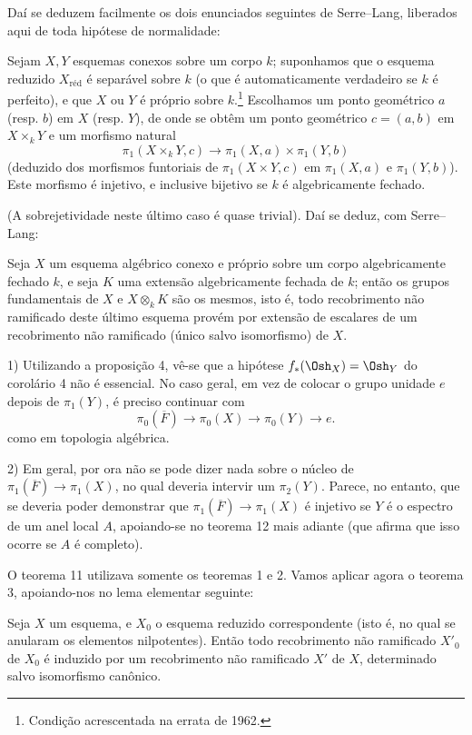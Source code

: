 Daí se deduzem facilmente os dois enunciados seguintes de Serre--Lang,
liberados aqui de toda hipótese de normalidade:

 Sejam $X,Y$ esquemas conexos sobre um corpo $k$;
suponhamos que o esquema reduzido $X_{\mathrm{réd}}$ é separável sobre $k$
(o que é automaticamente verdadeiro se $k$ é perfeito), e que $X$ ou $Y$ é
próprio sobre $k$.\footnote{Condição acrescentada na errata de 1962.}
Escolhamos um ponto geométrico $a$ (resp. $b$) em $X$ (resp. $Y$), de onde se
obtêm um ponto geométrico $c=(a,b)$ em $X\times_kY$ e um morfismo natural
\[
  \pi_1(X\times_kY,c)\longrightarrow
  \pi_1(X,a)\times\pi_1(Y,b)
\]
(deduzido dos morfismos funtoriais de $\pi_1(X\times Y,c)$ em $\pi_1(X,a)$
e $\pi_1(Y,b)$). Este morfismo é injetivo, e inclusive bijetivo se $k$ é
algebricamente fechado.

(A sobrejetividade neste último caso é quase trivial). Daí se deduz,
com Serre--Lang:

 Seja $X$ um esquema algébrico conexo e próprio sobre um corpo
algebricamente fechado $k$, e seja $K$ uma extensão algebricamente fechada
de $k$; então os grupos fundamentais de $X$ e $X\otimes_kK$ são os
mesmos, isto é, todo recobrimento não ramificado deste último esquema
provém por extensão de escalares de um recobrimento não ramificado (único
salvo isomorfismo) de $X$.


1) Utilizando a proposição 4, vê-se que a hipótese
$f_*(\Osh_X)=\Osh_Y$ do corolário 4 não é essencial. No caso geral, em vez
de colocar o grupo unidade $e$ depois de $\pi_1(Y)$, é preciso continuar com
\[
  \pi_0(\overline F)\longrightarrow\pi_0(X)
  \longrightarrow\pi_0(Y)\longrightarrow e.
\]
como em topologia algébrica.

2) Em geral, por ora não se pode dizer nada sobre o núcleo de
$\pi_1(\overline F)\longrightarrow\pi_1(X)$, no qual deveria intervir um
$\pi_2(Y)$. Parece, no entanto, que se deveria poder demonstrar que
$\pi_1(\overline F)\longrightarrow\pi_1(X)$ é injetivo se $Y$ é o espectro
de um anel local $A$, apoiando-se no teorema 12 mais adiante (que afirma que
isso ocorre se $A$ é completo).

O teorema 11 utilizava somente os teoremas 1 e 2. Vamos aplicar agora o
teorema 3, apoiando-nos no lema elementar seguinte:

 Seja $X$ um esquema, e $X_0$ o esquema reduzido correspondente
(isto é, no qual se anularam os elementos nilpotentes). Então todo
recobrimento não ramificado $X'_0$ de $X_0$ é induzido por um recobrimento
não ramificado $X'$ de $X$, determinado salvo isomorfismo canônico.


